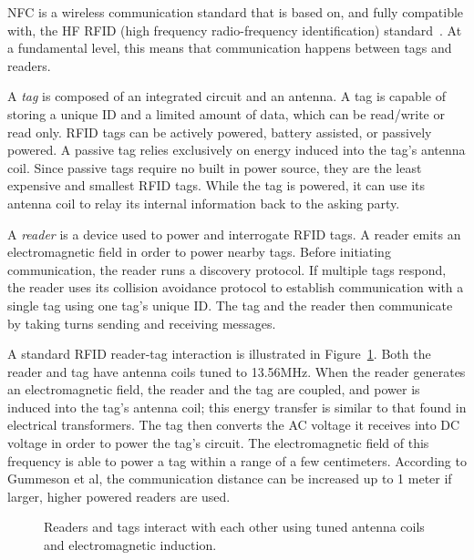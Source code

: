 \documentclass{sig-alternate}
\begin{document}
NFC is a wireless communication standard that is based on, and fully compatible with, the HF RFID (high frequency radio-frequency identification) standard~\cite{Gum2013}. At a fundamental level, this means that communication happens between tags and readers.

A \textit{tag} is composed of an integrated circuit and an antenna. A tag is capable of storing a unique ID and a limited amount of data, which can be read/write or read only. RFID tags can be actively powered, battery assisted, or passively powered. A passive tag relies exclusively on energy induced into the tag's antenna coil. Since passive tags require no built in power source, they are the least expensive and smallest RFID tags. While the tag is powered, it can use its antenna coil to relay its internal information back to the asking party.~\cite{wiki:RFID}

A \textit{reader} is a device used to power and interrogate RFID tags. A reader emits an electromagnetic field in order to power nearby tags. Before initiating communication, the reader runs a discovery protocol. If multiple tags respond, the reader uses its collision avoidance protocol to establish communication with a single tag using one tag's unique ID. The tag and the reader then communicate by taking turns sending and receiving messages.~\cite{Gum2013}

A standard RFID reader-tag interaction is illustrated in Figure~\ref{fig:rfid}. Both the reader and tag have antenna coils tuned to 13.56MHz. When the reader generates an electromagnetic field, the reader and the tag are coupled, and power is induced into the tag's antenna coil; this energy transfer is similar to that found in electrical transformers. The tag then converts the AC voltage it receives into DC voltage in order to power the tag's circuit. The electromagnetic field of this frequency is able to power a tag within a range of a few centimeters. According to Gummeson et al, the communication distance can be increased up to 1 meter if larger, higher powered readers are used.~\cite{Gum2013}


\begin{figure}
\centering
{}
\caption{Readers and tags interact with each other using tuned antenna coils and electromagnetic induction.}
\label{fig:rfid}
\end{figure}
\end{document}
